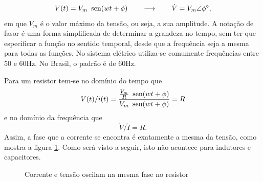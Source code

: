 \[
V(t)=V_{m}\mbox{\, sen}(wt+\phi)\qquad\longrightarrow\qquad\dot{V}=V_{m}\angle\phi^{\circ},
\]
em que $V_{m}$ é o valor máximo da tensão, ou seja, a sua amplitude.
A notação de fasor é uma forma simplificada de determinar a grandeza
no tempo, sem ter que especificar a função no sentido temporal, desde
que a frequência seja a mesma para todas as funções. No sistema elétrico utiliza-se comumente
frequências entre 50 e 60Hz. No Brasil, o padrão é de 60Hz. 

Para um resistor tem-se no domínio do tempo que 
\[
V(t)/i(t)=\frac{\frac{V_{m}}{R}\mbox{\, sen}(wt+\phi)}{V_{m}\mbox{\, sen}(wt+\phi)}=R
\]
 e no domínio da frequência que 
\[
\dot{V}/\dot{I}=R.
\]
 Assim, a fase que a corrente se encontra é exatamente a mesma da
tensão, como mostra a figura \ref{fig:fase-ct-resistor}. Como será
visto a seguir, isto não acontece para indutores e capacitores.








\begin{figure}[H]
\begin{center}
\caption{\label{fig:fase-ct-resistor}Corrente e tensão oscilam na mesma fase no resistor}
\end{center}
\end{figure}


